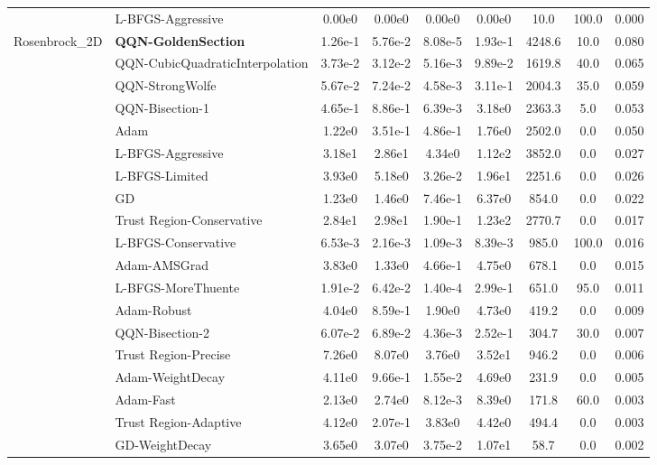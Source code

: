 \documentclass[10pt]{article}
\begin{document}
\begin{longtable}{|l|l|c|c|c|c|c|c|c|}
\hline
 & L-BFGS-Aggressive & 0.00e0 & 0.00e0 & 0.00e0 & 0.00e0 & 10.0 & 100.0 & 0.000 \\
Rosenbrock\_2D & \textbf{QQN-GoldenSection} & 1.26e-1 & 5.76e-2 & 8.08e-5 & 1.93e-1 & 4248.6 & 10.0 & 0.080 \\
\hline
 & QQN-CubicQuadraticInterpolation & 3.73e-2 & 3.12e-2 & 5.16e-3 & 9.89e-2 & 1619.8 & 40.0 & 0.065 \\
\hline
 & QQN-StrongWolfe & 5.67e-2 & 7.24e-2 & 4.58e-3 & 3.11e-1 & 2004.3 & 35.0 & 0.059 \\
\hline
 & QQN-Bisection-1 & 4.65e-1 & 8.86e-1 & 6.39e-3 & 3.18e0 & 2363.3 & 5.0 & 0.053 \\
\hline
 & Adam & 1.22e0 & 3.51e-1 & 4.86e-1 & 1.76e0 & 2502.0 & 0.0 & 0.050 \\
\hline
 & L-BFGS-Aggressive & 3.18e1 & 2.86e1 & 4.34e0 & 1.12e2 & 3852.0 & 0.0 & 0.027 \\
\hline
 & L-BFGS-Limited & 3.93e0 & 5.18e0 & 3.26e-2 & 1.96e1 & 2251.6 & 0.0 & 0.026 \\
\hline
 & GD & 1.23e0 & 1.46e0 & 7.46e-1 & 6.37e0 & 854.0 & 0.0 & 0.022 \\
\hline
 & Trust Region-Conservative & 2.84e1 & 2.98e1 & 1.90e-1 & 1.23e2 & 2770.7 & 0.0 & 0.017 \\
\hline
 & L-BFGS-Conservative & 6.53e-3 & 2.16e-3 & 1.09e-3 & 8.39e-3 & 985.0 & 100.0 & 0.016 \\
\hline
 & Adam-AMSGrad & 3.83e0 & 1.33e0 & 4.66e-1 & 4.75e0 & 678.1 & 0.0 & 0.015 \\
\hline
 & L-BFGS-MoreThuente & 1.91e-2 & 6.42e-2 & 1.40e-4 & 2.99e-1 & 651.0 & 95.0 & 0.011 \\
\hline
 & Adam-Robust & 4.04e0 & 8.59e-1 & 1.90e0 & 4.73e0 & 419.2 & 0.0 & 0.009 \\
\hline
 & QQN-Bisection-2 & 6.07e-2 & 6.89e-2 & 4.36e-3 & 2.52e-1 & 304.7 & 30.0 & 0.007 \\
\hline
 & Trust Region-Precise & 7.26e0 & 8.07e0 & 3.76e0 & 3.52e1 & 946.2 & 0.0 & 0.006 \\
\hline
 & Adam-WeightDecay & 4.11e0 & 9.66e-1 & 1.55e-2 & 4.69e0 & 231.9 & 0.0 & 0.005 \\
\hline
 & Adam-Fast & 2.13e0 & 2.74e0 & 8.12e-3 & 8.39e0 & 171.8 & 60.0 & 0.003 \\
\hline
 & Trust Region-Adaptive & 4.12e0 & 2.07e-1 & 3.83e0 & 4.42e0 & 494.4 & 0.0 & 0.003 \\
\hline
 & GD-WeightDecay & 3.65e0 & 3.07e0 & 3.75e-2 & 1.07e1 & 58.7 & 0.0 & 0.002 \\

\end{longtable}
\end{document}
